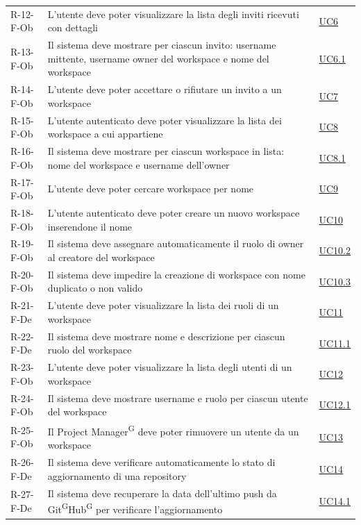 \documentclass[a4paper, 11pt]{article}
\begin{document}
\begin{longtable}[c]{ >{\centering\arraybackslash}m{2.5cm} >{\centering\arraybackslash}m{8.3cm} >{\centering\arraybackslash}m{3.5cm} }
    R-12-F-Ob & L'utente deve poter visualizzare la lista degli inviti ricevuti con dettagli & \hyperref[UC6]{UC6} \\
    R-13-F-Ob & Il sistema deve mostrare per ciascun invito: username mittente, username owner del workspace e nome del workspace & \hyperref[UC6.1]{UC6.1} \\
    R-14-F-Ob & L'utente deve poter accettare o rifiutare un invito a un workspace & \hyperref[UC7]{UC7} \\
    R-15-F-Ob & L'utente autenticato deve poter visualizzare la lista dei workspace a cui appartiene & \hyperref[UC8]{UC8} \\
    R-16-F-Ob & Il sistema deve mostrare per ciascun workspace in lista: nome del workspace e username dell'owner & \hyperref[UC8.1]{UC8.1} \\
    R-17-F-Ob & L'utente deve poter cercare workspace per nome & \hyperref[UC9]{UC9} \\
    R-18-F-Ob & L'utente autenticato deve poter creare un nuovo workspace inserendone il nome & \hyperref[UC10]{UC10} \\
    R-19-F-Ob & Il sistema deve assegnare automaticamente il ruolo di owner al creatore del workspace & \hyperref[UC10.2]{UC10.2} \\
    R-20-F-Ob & Il sistema deve impedire la creazione di workspace con nome duplicato o non valido & \hyperref[UC10.3]{UC10.3} \\
    R-21-F-De & L'utente deve poter visualizzare la lista dei ruoli di un workspace & \hyperref[UC11]{UC11} \\
    R-22-F-De & Il sistema deve mostrare nome e descrizione per ciascun ruolo del workspace & \hyperref[UC11.1]{UC11.1} \\
    R-23-F-Ob & L'utente deve poter visualizzare la lista degli utenti di un workspace & \hyperref[UC12]{UC12} \\
    R-24-F-Ob & Il sistema deve mostrare username e ruolo per ciascun utente del workspace & \hyperref[UC12.1]{UC12.1} \\
    R-25-F-Ob & Il Project Manager\textsuperscript{G} deve poter rimuovere un utente da un workspace & \hyperref[UC13]{UC13} \\
    R-26-F-De & Il sistema deve verificare automaticamente lo stato di aggiornamento di una repository & \hyperref[UC14]{UC14} \\
    R-27-F-De & Il sistema deve recuperare la data dell'ultimo push da Git\textsuperscript{G}Hub\textsuperscript{G} per verificare l'aggiornamento & \hyperref[UC14.1]{UC14.1} \\

\end{longtable}
\end{document}
